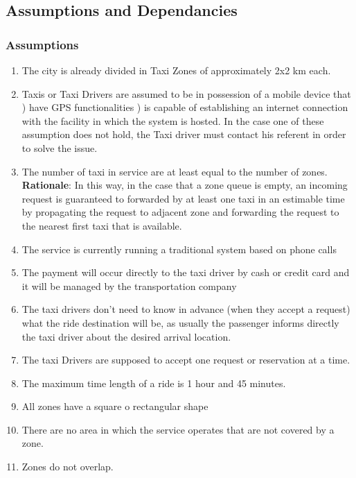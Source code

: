 \documentclass[11pt, a4paper,titlepage]{article}
\begin{document}
\subsection{Assumptions and Dependancies}
\subsubsection{Assumptions}
	\begin{enumerate}
		\item \label{itm: Assumption_Zones} The city is already divided in Taxi Zones of approximately 2x2 km each. 
		\item \label{itm: Assumption_MobileProvisioning} Taxis or Taxi Drivers are assumed to be in possession of a mobile device that  
			) have GPS functionalities 
			) is capable of establishing an internet connection with the facility in which the system is hosted. In the case one of these assumption does not hold, the Taxi driver must contact his referent in order to solve the issue.
		\item \label{itm: Assumption_NumberOfTaxis} The number of taxi in service are at least equal to the number of zones.
		\textbf{Rationale}: In this way, in the case that a zone queue is empty, an incoming request is guaranteed to forwarded by at least one taxi in an estimable time by propagating the request to adjacent zone and forwarding the request to the nearest first taxi that is available.
		\item \label{itm: Assumption_FormerSystems} The service is currently running a traditional system based on phone calls	
		\item \label{itm: Assumption_Payment} The payment will occur directly to the taxi driver by cash or credit card and it will be managed by the transportation company
		\item \label{itm: Assumption_Destination} The taxi drivers don't need to know in advance (when they accept a request) what the ride destination will be, as usually the passenger informs directly the taxi driver about the desired arrival location.
		\item \label{itm: Assumption_OneReservation} The taxi Drivers are supposed to accept one request or reservation at a time.
		\item \label{itm: Assumption_LengthTime} The maximum time length of a ride is 1 hour and 45 minutes.
		\item \label{itm: Assumption_SquareZones} All zones have a square o rectangular shape
		\item \label{itm: Assumption_Coverage} There are no area in which the service operates that are not covered by a zone.
		\item \label{itm: Assumption_Overlapping} Zones do not overlap.
	\end{enumerate}
\pagebreak
\end{document}
